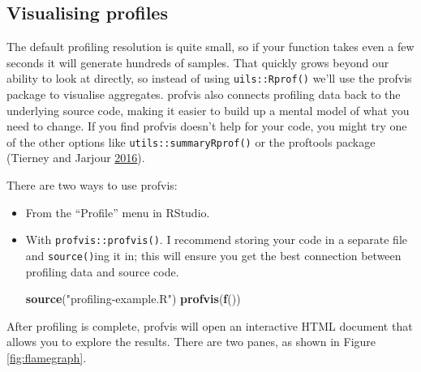 \documentclass[]{book}
\makeatletter
\newenvironment{Shaded}{\begin{snugshade}}{\end{snugshade}}
\newcommand{\KeywordTok}[1]{\textcolor[rgb]{0.27,0.27,0.27}{\textbf{#1}}}
\newcommand{\NormalTok}[1]{#1}
\newcommand{\StringTok}[1]{\textcolor[rgb]{0.5,0.5,0.5}{#1}}
\newcommand{\indexc}[1]{\index{#1@\texttt{#1}}}
\makeatother
\begin{document}
\hypertarget{visualising-profiles}{%
\subsection{Visualising profiles}\label{visualising-profiles}}

\indexc{profvis()}

The default profiling resolution is quite small, so if your function takes even a few seconds it will generate hundreds of samples. That quickly grows beyond our ability to look at directly, so instead of using \texttt{uils::Rprof()} we'll use the profvis package to visualise aggregates. profvis also connects profiling data back to the underlying source code, making it easier to build up a mental model of what you need to change. If you find profvis doesn't help for your code, you might try one of the other options like \texttt{utils::summaryRprof()} or the proftools package (Tierney and Jarjour \protect\hyperlink{ref-proftools}{2016}).

There are two ways to use profvis:

\begin{itemize}
\item
  From the ``Profile'' menu in RStudio.
\item
  With \texttt{profvis::profvis()}. I recommend storing your code in a separate
  file and \texttt{source()}ing it in; this will ensure you get the best connection
  between profiling data and source code.

\begin{Shaded}
\begin{Highlighting}[]
\KeywordTok{source}\NormalTok{(}\StringTok{"profiling-example.R"}\NormalTok{)}
\KeywordTok{profvis}\NormalTok{(}\KeywordTok{f}\NormalTok{())}
\end{Highlighting}
\end{Shaded}
\end{itemize}

After profiling is complete, profvis will open an interactive HTML document that allows you to explore the results. There are two panes, as shown in Figure \ref{fig:flamegraph}.
\end{document}

